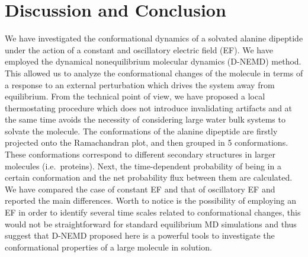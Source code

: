 \documentclass[journal=jctcce,manuscript=manuscript]{achemso}
\begin{document}
\section{Discussion and Conclusion}
We have investigated the conformational
dynamics of a solvated alanine dipeptide under the action of a constant and oscillatory electric
field (EF).
We have employed the dynamical nonequilibrium molecular dynamics
(D-NEMD) method. This allowed us to analyze the conformational changes
of the molecule in terms of a response to an external perturbation
which drives the system away from equilibrium. From the technical
point of view, we have proposed a local thermostating procedure which
does not introduce invalidating artifacts and at the same time avoids
the necessity of considering large water bulk systems to solvate the
molecule.
The conformations of the alanine dipeptide are
firstly projected onto the Ramachandran plot, and
then grouped in 5  conformations.
These conformations
correspond to different secondary structures in larger molecules
(i.e.~proteins).
Next, the time-dependent probability
of being in a certain conformation and the net probability flux
between them are calculated.
We have compared the case of constant EF and that of oscillatory EF
and reported the main differences.
Worth to notice is the possibility of employing an EF in order to identify several time scales related to conformational changes, this would not be straightforward for standard equilibrium MD simulations and thus suggest that D-NEMD proposed here is a powerful tools to investigate the conformational properties of a large molecule in solution.
\end{document}
